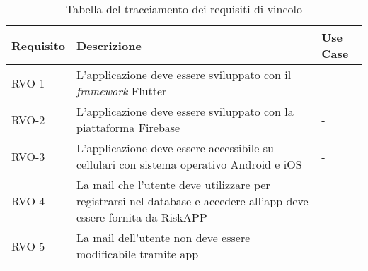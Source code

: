 \begin{table}[htb]%
\caption{Tabella del tracciamento dei requisiti di vincolo}
\label{tab:requisiti-vincolo}
\begin{tabularx}{\textwidth}{lXl}
\hline
\textbf{Requisito} & \textbf{Descrizione} & \textbf{Use Case}\\
\hline\hline
RVO-1    & L'applicazione deve essere sviluppato con il \emph{framework} Flutter & - \\
\hline
RVO-2    & L'applicazione deve essere sviluppato con la piattaforma Firebase & - \\
\hline
RVO-3    & L'applicazione deve essere accessibile su cellulari con sistema operativo Android e iOS & - \\
\hline
RVO-4    & La mail che l'utente deve utilizzare per registrarsi nel database e accedere all'app deve essere fornita da RiskAPP & - \\
\hline
RVO-5    & La mail dell'utente non deve essere modificabile tramite app & - \\
\hline
\end{tabularx}
\end{table}%
